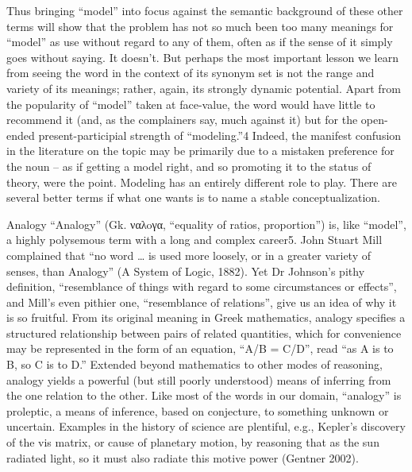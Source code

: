 Thus bringing ``model'' into focus against the semantic background of
these other terms will show that the problem has not so much been too
many meanings for ``model'' as use without regard to any of them, often
as if the sense of it simply goes without saying. It doesn't. But
perhaps the most important lesson we learn from seeing the word in the
context of its synonym set is not the range and variety of its meanings;
rather, again, its strongly dynamic potential. Apart from the popularity
of ``model'' taken at face-value, the word would have little to
recommend it (and, as the complainers say, much against it) but for the
open-ended present-participial strength of ``modeling.''4 Indeed, the
manifest confusion in the literature on the topic may be primarily due
to a mistaken preference for the noun -- as if getting a model right,
and so promoting it to the status of theory, were the point. Modeling
has an entirely different role to play. There are several better terms
if what one wants is to name a stable conceptualization.

Analogy ``Analogy'' (Gk. ναλoγα, ``equality of ratios, proportion'') is,
like ``model'', a highly polysemous term with a long and complex
career5. John Stuart Mill complained that ``no word \ldots{} is used
more loosely, or in a greater variety of senses, than Analogy'' (A
System of Logic, 1882). Yet Dr Johnson's pithy definition, ``resemblance
of things with regard to some circumstances or effects'', and Mill's
even pithier one, ``resemblance of relations'', give us an idea of why
it is so fruitful. From its original meaning in Greek mathematics,
analogy specifies a structured relationship between pairs of related
quantities, which for convenience may be represented in the form of an
equation, ``A/B = C/D'', read ``as A is to B, so C is to D.'' Extended
beyond mathematics to other modes of reasoning, analogy yields a
powerful (but still poorly understood) means of inferring from the one
relation to the other. Like most of the words in our domain, ``analogy''
is proleptic, a means of inference, based on conjecture, to something
unknown or uncertain. Examples in the history of science are plentiful,
e.g., Kepler's discovery of the vis matrix, or cause of planetary
motion, by reasoning that as the sun radiated light, so it must also
radiate this motive power (Gentner 2002).

